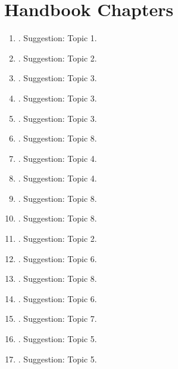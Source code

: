 \documentclass[12pt]{article}
\begin{document}
\section{Handbook Chapters}
\begin{enumerate}
\item \citet{oecd2011divided}. Suggestion: Topic 1.
\item \citet{dinardo2011program}. Suggestion: Topic 2. 
\item \citet{rogerson2011search}. Suggestion: Topic 3.
\item \citet{rebitzer2011extrinsic}. Suggestion: Topic 3.
\item \citet{meghir2011earnings}. Suggestion: Topic 3.
\item \citet{roland2011racial}. Suggestion: Topic 8.
\item \citet{acemoglu2011skills}. Suggestion: Topic 4.
\item \citet{currie2011human}. Suggestion: Topic 4.
\item \citet{black2011recent}. Suggestion: Topic 8.
\item \citet{galor2011ineq}. Suggestion: Topic 8.
\item \citet{neal2011design}. Suggestion: Topic 2.
\item \citet{almlund2011perso}. Suggestion: Topic 6.
\item \citet{piketty2000theories}. Suggestion: Topic 8.
\item \citet{sacerdote2010nature}. Suggestion: Topic 6.
\item \citet{cawley2011health}. Suggestion: Topic 7.
\item \citet{robson2010evolutionary}. Suggestion: Topic 5.
\item \citet{raquel2010culture}. Suggestion: Topic 5.
\end{enumerate}




\end{document}
